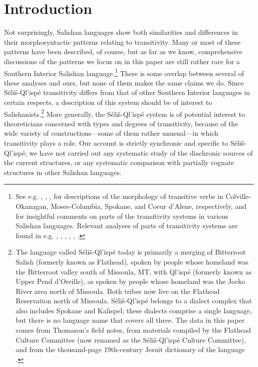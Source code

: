 \documentclass[output=paper,colorlinks,citecolor=brown]{langscibook}
\begin{document}
\section{Introduction}
\label{thomason_section_1}
  Not surprisingly, Salishan languages show both similarities and
  differences in their morphosyntactic patterns relating to
  transitivity.  Many or most of these patterns have been described,
  of course, but as far as we know, comprehensive discussions of the
  patterns we focus on in this paper are still rather rare for a
  Southern Interior Salishan language.\footnote{See e.g.
  , , ,
   for descriptions of
  the morphology of transitive verbs in Colville-Okanagan,
  Moses-Columbia, Spokane, and Coeur d'Alene, respectively, and
   for insightful comments on parts of the transitivity
  systems in various Salishan languages.  Relevant analyses of parts
  of transitivity systems are found in e.g. ,
  , , ,
  , .}
  There is some overlap between several of these analyses and ours,
  but none of them makes the same claims we do.  Since
  S\'eli\v{s}-Ql'isp\'e transitivity differs from that of other
  Southern Interior languages in certain respects, a description of
  this system should be of interest to Salishanists.\footnote{The
  language called S\'eli\v{s}-Ql'isp\'e today is primarily a merging
  of Bitterroot Salish (formerly known as Flathead), spoken by people
  whose homeland was the Bitterroot valley south of Missoula, MT,
  with Ql'isp\'e (formerly known as Upper Pend d'Oreille), as spoken
  by people whose homeland was the Jocko River area north of
  Missoula.  Both tribes now live on the Flathead Reservation north
  of Missoula.  S\'eli\v{s}-Ql'isp\'e belongs to a dialect complex
  that also includes Spokane and Kalispel; these dialects comprise a
  single language, but there is no language name that covers all
  three.  The data in this paper comes from Thomason's field notes,
  from materials compiled by the Flathead Culture Committee (now
  renamed as the S\'eli\v{s}-Ql'isp\'e Culture Committee), and from
  the thousand-page 19th-century Jesuit dictionary of the language
  .}  More generally, the
  S\'eli\v{s}-Ql'isp\'e system is of potential interest to
  theoreticians concerned with types and degrees of transitivity,
  because of the wide variety of constructions---some of them
  rather unusual---in which transitivity plays a role.  Our account
  is strictly synchronic and specific to S\'eli\v{s}-Ql'isp\'e; we
  have not carried out any systematic study of the diachronic sources
  of the current structures, or any systematic comparison with
  partially cognate structures in other Salishan languages.
\end{document}
